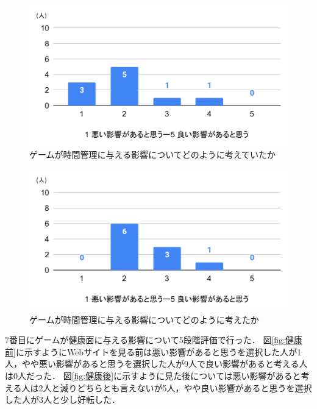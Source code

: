 \documentclass[12pt,a4j,titlepage]{ltjsarticle}
\begin{document}
\begin{figure}[H]
 \begin{center}
  \includegraphics[keepaspectratio, scale=0.6]{PDF/時間前.pdf}
 \end{center}
 \caption{ゲームが時間管理に与える影響についてどのように考えていたか}
 \label{fig:時間前}
\end{figure}

\begin{figure}[H]
 \begin{center}
  \includegraphics[keepaspectratio, scale=0.6]{PDF/時間後.pdf}
 \end{center}
 \caption{ゲームが時間管理に与える影響についてどのように考えたか}
 \label{fig:時間後}
\end{figure}

7番目にゲームが健康面に与える影響について5段階評価で行った．
図\ref{fig:健康前}に示すようにWebサイトを見る前は悪い影響があると思うを選択した人が1人，やや悪い影響があると思うを選択した人が9人で良い影響があると考える人は0人だった．
図\ref{fig:健康後}に示すように見た後については悪い影響があると考える人は2人と減りどちらとも言えないが5人，やや良い影響があると思うを選択した人が3人と少し好転した．
\end{document}
